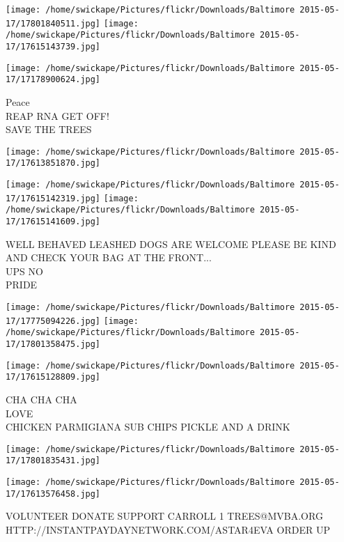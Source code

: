\documentclass[10pt,letterpaper]{article}
\begin{document}
\texttt{[image: /home/swickape/Pictures/flickr/Downloads/Baltimore 2015-05-17/17801840511.jpg]}
\texttt{[image: /home/swickape/Pictures/flickr/Downloads/Baltimore 2015-05-17/17615143739.jpg]}

\texttt{[image: /home/swickape/Pictures/flickr/Downloads/Baltimore 2015-05-17/17178900624.jpg]}

Peace\\
REAP RNA GET OFF!\\
SAVE THE TREES\\
\pagebreak

\texttt{[image: /home/swickape/Pictures/flickr/Downloads/Baltimore 2015-05-17/17613851870.jpg]}

\vspace{0.25in}
\texttt{[image: /home/swickape/Pictures/flickr/Downloads/Baltimore 2015-05-17/17615142319.jpg]}
\texttt{[image: /home/swickape/Pictures/flickr/Downloads/Baltimore 2015-05-17/17615141609.jpg]}

WELL BEHAVED LEASHED DOGS ARE WELCOME PLEASE BE KIND AND CHECK YOUR BAG AT THE FRONT...\\
UPS NO\\
PRIDE\\
\pagebreak

\texttt{[image: /home/swickape/Pictures/flickr/Downloads/Baltimore 2015-05-17/17775094226.jpg]}
\texttt{[image: /home/swickape/Pictures/flickr/Downloads/Baltimore 2015-05-17/17801358475.jpg]}

\texttt{[image: /home/swickape/Pictures/flickr/Downloads/Baltimore 2015-05-17/17615128809.jpg]}

CHA CHA CHA\\
LOVE\\
CHICKEN PARMIGIANA SUB CHIPS PICKLE AND A DRINK\\
\pagebreak

\texttt{[image: /home/swickape/Pictures/flickr/Downloads/Baltimore 2015-05-17/17801835431.jpg]}

\vspace{0.25in}
\texttt{[image: /home/swickape/Pictures/flickr/Downloads/Baltimore 2015-05-17/17613576458.jpg]}

VOLUNTEER DONATE SUPPORT CARROLL 1 TREES@MVBA.ORG\\
HTTP://INSTANTPAYDAYNETWORK.COM/ASTAR4EVA ORDER UP\\
\pagebreak
\end{document}
